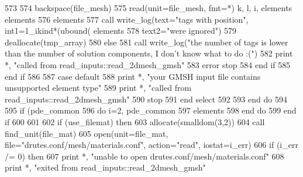 \begin{DoxyCode}
573                 
574                 backspace(file_mesh)
575                 \textcolor{keyword}{read}(unit=file_mesh, fmt=*) k, l, i, elements%
      elements%
576 \textcolor{comment}{                elements%
577 \textcolor{comment}{                }\textcolor{keyword}{call }write_log(text=\textcolor{stringliteral}{"tags with position"}, int1=1\_ikind*(ubound(
      elements%
578 \textcolor{comment}{                    text2=}\textcolor{stringliteral}{"were ignored"})
579                 \textcolor{keyword}{deallocate}(tmp\_array)
580               \textcolor{keywordflow}{else}
581                 \textcolor{keyword}{call }write_log(\textcolor{stringliteral}{"the number of tags is lower than the number of solution components, I don't
       know what to do :("}\textcolor{comment}{)}
582 \textcolor{comment}{                print *, }\textcolor{stringliteral}{"called from read\_inputs::read\_2dmesh\_gmsh"}
583                 error stop
584 \textcolor{keywordflow}{              end if}
585 \textcolor{keywordflow}{            end if}
586               
587 \textcolor{keywordflow}{          case default}
588             print *, \textcolor{stringliteral}{"your GMSH input file contains unsupported element type"}
589             print *, \textcolor{stringliteral}{"called from read\_inputs::read\_2dmesh\_gmsh"}
590             stop
591 \textcolor{keywordflow}{         end select}
592          
593 \textcolor{keywordflow}{      end do}
594       
595       \textcolor{keywordflow}{if} (pde_common%
596         \textcolor{keywordflow}{do} i=2, pde_common%
597           elements%
598 \textcolor{keywordflow}{        end do}
599 \textcolor{keywordflow}{      end if}
600 
601       
602       \textcolor{keywordflow}{if} (use\_filemat) \textcolor{keywordflow}{then}
603         \textcolor{keyword}{allocate}(smalldom(3,2))
604         \textcolor{keyword}{call }find_unit(file\_mat)
605         \textcolor{keyword}{open}(unit=file\_mat, file=\textcolor{stringliteral}{"drutes.conf/mesh/materials.conf"}, action=\textcolor{stringliteral}{"read"}\textcolor{comment}{, iostat=i\_err)}
606 \textcolor{comment}{        }\textcolor{keywordflow}{if} (i\_err /= 0) \textcolor{keywordflow}{then}
607           print *, \textcolor{stringliteral}{"unable to open drutes.conf/mesh/materials.conf"}
608           print *, \textcolor{stringliteral}{"exited from read\_inputs::read\_2dmesh\_gmsh"}
}
\end{DoxyCode}
